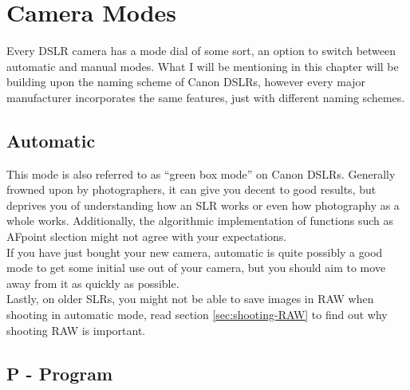 \section{Camera Modes}

Every \gls{DSLR} camera has a mode dial of some sort, an option to switch between automatic and manual modes. What I will be mentioning in this chapter will be building upon the naming scheme of Canon \glspl{DSLR}, however every major manufacturer incorporates the same features, just with different naming schemes.


\subsection{Automatic}
\label{subsec:automatic}

This mode is also referred to as ``green box mode'' on Canon \glspl{DSLR}. Generally frowned upon by photographers, it can give you decent to good results, but deprives you of understanding how an \gls{SLR} works or even how photography as a whole works. Additionally, the algorithmic implementation of functions such as \gls{AFpoint} slection might not agree with your expectations.
\\
If you have just bought your new camera, automatic is quite possibly a good mode to get some initial use out of your camera, but you should aim to move away from it as quickly as possible.
\\
Lastly, on older \glspl{SLR}, you might not be able to save images in \gls{RAW} when shooting in automatic mode, read section \ref{sec:shooting-RAW} to find out why shooting \gls{RAW} is important.


\subsection{P - Program}
\label{sec:P-Program}

